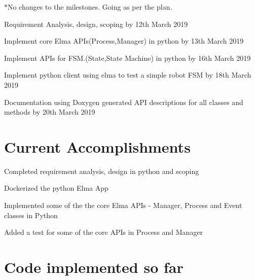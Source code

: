 $\ast$\+No changes to the milestones. Going as per the plan.
\begin{DoxyEnumerate}
\item Requirement Analysis, design, scoping by 12th March 2019
\end{DoxyEnumerate}
\begin{DoxyEnumerate}
\item Implement core Elma A\+P\+Is(\+Process,\+Manager) in python by 13th March 2019
\end{DoxyEnumerate}
\begin{DoxyEnumerate}
\item Implement A\+PI\textquotesingle{}s for F\+SM.(State,State Machine) in python by 16th March 2019
\end{DoxyEnumerate}
\begin{DoxyEnumerate}
\item Implement python client using elma to test a simple robot F\+SM by 18th March 2019
\end{DoxyEnumerate}
\begin{DoxyEnumerate}
\item Documentation using Doxygen generated A\+PI descriptions for all classes and methods by 20th March 2019
\end{DoxyEnumerate}

\section*{Current Accomplishments}


\begin{DoxyEnumerate}
\item Completed requirement analysis, design in python and scoping
\end{DoxyEnumerate}
\begin{DoxyEnumerate}
\item Dockerized the python Elma App
\end{DoxyEnumerate}
\begin{DoxyEnumerate}
\item Implemented some of the the core Elma A\+P\+Is -\/ Manager, Process and Event classes in Python
\end{DoxyEnumerate}
\begin{DoxyEnumerate}
\item Added a test for some of the core A\+P\+Is in Process and Manager
\end{DoxyEnumerate}

\section*{Code implemented so far}


